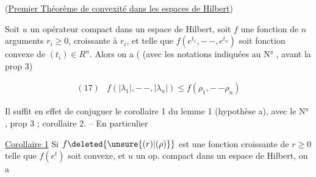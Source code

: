 
\reversemarginpar{}\normalmarginpar
(\uline{Premier Théorème de convexité dans les espaces de Hilbert})

\reversemarginpar
{}
\normalmarginpar
{} Soit $u$ un opérateur compact dans un espace de Hilbert, soit  $f$ une fonction  de $n$ arguments $r_i\geq0$, croissante  à  $r_i$, et telle que $f(e^{t_1},\mathord{-}\,\mathord{-},e^{t_n})$ soit fonction convexe de $(t_i)\in R^n$. Alors on a ( (avec les notations indiquées au N° , avant la prop 3)

\[
\begin{array}{ll}
(17) & \displaystyle f(|\lambda_1|,\mathord{-}\,\mathord{-},|\lambda_n|)\leq f(\rho_1,\mathord{-}\,\mathord{-}\rho_n)
\end{array}
\]

Il suffit en effet de conjuguer le corollaire 1 du lemme 1  (hypothèse a), avec le N° , prop 3 ; corollaire 2. -- En particulier

\uline{Corollaire 1} Si $f\deleted{\unsure{(r)|(\rho)}}$ est une fonction  croissante de $r\geq0$ telle que $f(e^t)$ soit convexe, et $u$ un op. compact dans un espace de Hilbert, on a

\reversemarginpar{}\normalmarginpar

